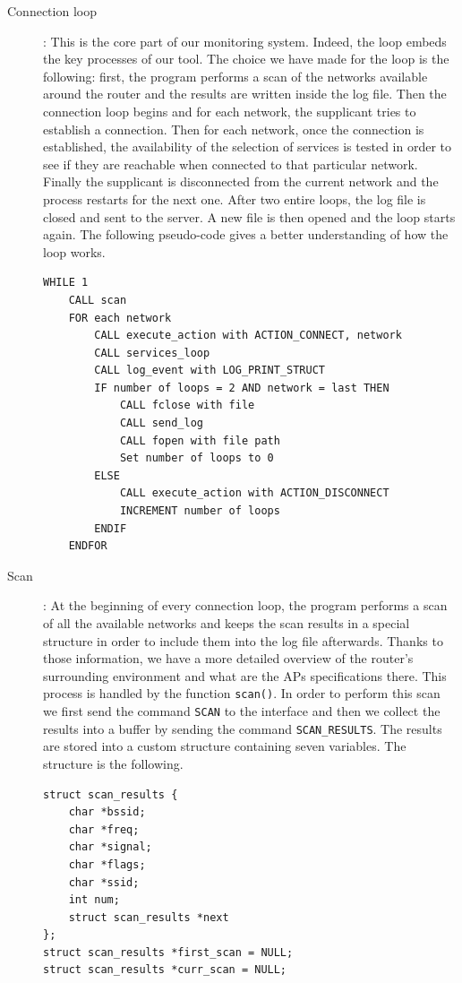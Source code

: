 \begin{description}
	\item[Connection loop]: This is the core part of our monitoring system. Indeed, the loop embeds the key processes of our tool. The choice we have made for the loop is the following: first, the program performs a scan of the networks available around the router and the results are written inside the log file. Then the connection loop begins and for each network, the supplicant tries to establish a connection. Then for each network, once the connection is established, the availability of the selection of services is tested in order to see if they are reachable when connected to that particular network. Finally the supplicant is disconnected from the current network and the process restarts for the next one. After two entire loops, the log file is closed and sent to the server. A new file is then opened and the loop starts again. The following pseudo-code gives a better understanding of how the loop works.\\

\begin{lstlisting}[frame=single,breaklines=true,caption={Connection loop pseudo-code}]
WHILE 1
	CALL scan
	FOR each network
		CALL execute_action with ACTION_CONNECT, network
		CALL services_loop
		CALL log_event with LOG_PRINT_STRUCT
		IF number of loops = 2 AND network = last THEN
			CALL fclose with file
			CALL send_log
			CALL fopen with file path
			Set number of loops to 0
		ELSE
			CALL execute_action with ACTION_DISCONNECT
			INCREMENT number of loops
		ENDIF
	ENDFOR
\end{lstlisting}

	\item[Scan]: At the beginning of every connection loop, the program performs a scan of all the available networks and keeps the scan results in a special structure in order to include them into the log file afterwards. Thanks to those information, we have a more detailed overview of the router's surrounding environment and what are the APs specifications there. This process is handled by the function \texttt{scan()}. In order to perform this scan we first send the command \texttt{SCAN} to the interface and then we collect the results into a buffer by sending the command \texttt{SCAN\_RESULTS}. The results are stored into a custom structure containing seven variables. The structure is the following.\\

\begin{lstlisting}[frame=single,breaklines=true,caption={\texttt{scan\_results} structure}]
struct scan_results {
	char *bssid;
	char *freq;
	char *signal;
	char *flags;
	char *ssid;
	int num;
	struct scan_results *next
};
struct scan_results *first_scan = NULL;
struct scan_results *curr_scan = NULL;
\end{lstlisting}
	

\end{description}
